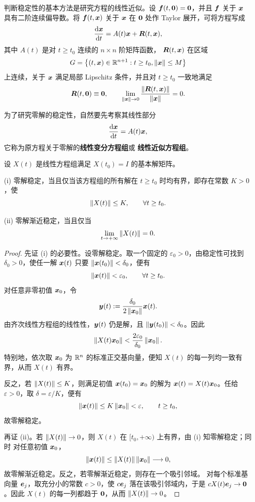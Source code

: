 判断稳定性的基本方法是研究方程的线性近似。设
$\boldsymbol{f}(t,\boldsymbol{0})=\boldsymbol{0}$，并且 $\boldsymbol{f}$ 关于
$\boldsymbol{x}$ 具有二阶连续偏导数。将 $\boldsymbol{f}(t,\boldsymbol{x})$ 关于
$\boldsymbol{x}$ 在 $\boldsymbol{0}$ 处作 Taylor 展开，可将方程写成
\[
	\dfrac{\mathrm{d}\boldsymbol{x}}{\mathrm{d} t}
	=A(t)\boldsymbol{x}+\boldsymbol{R}(t,\boldsymbol{x}),
\]
其中 $A(t)$ 是对 $t\geq t_0$ 连续的 $n\times n$ 阶矩阵函数，
$\boldsymbol{R}(t,\boldsymbol{x})$ 在区域
\[
	G=\left\{
	(t,\boldsymbol{x})\in\mathbb{R}^{n+1}:
	t\geq t_0,
	\left\| \boldsymbol{x} \right\|\leq M
	\right\}
\]
上连续，关于 $\boldsymbol{x}$ 满足局部 Lipschitz 条件，并且对
$t\geq t_0$ 一致地满足
\[
	\boldsymbol{R}(t,\boldsymbol{0})\equiv\boldsymbol{0},
	\qquad
	\lim_{\left\| \boldsymbol{x} \right\|\to0}
	\dfrac{\left\| \boldsymbol{R}(t,\boldsymbol{x}) \right\|}
	{\left\| \boldsymbol{x} \right\|}=0.
\]

为了研究零解的稳定性，自然要先考察其线性部分
\[
	\dfrac{\mathrm{d}\boldsymbol{x}}{\mathrm{d} t}=A(t)\boldsymbol{x},
\]
它称为原方程关于零解的\textbf{线性变分方程组}或
\textbf{线性近似方程组}。

\begin{lemma}\label{lem:线性系统零解稳定性判据}
	设 $X(t)$ 是线性方程组满足 $X(t_0)=I$ 的基本解矩阵。

	\textnormal{(i)} 零解稳定，当且仅当该方程组的所有解在
	$t\geq t_0$ 时均有界，即存在常数 $K>0$，使
	\[
		\left\| X(t) \right\|\leq K,
		\qquad \forall t\geq t_0.
	\]

	\textnormal{(ii)} 零解渐近稳定，当且仅当
	\[
		\lim_{t\to+\infty}\left\| X(t) \right\|=0.
	\]
\end{lemma}

\begin{proof}
	先证 \textnormal{(i)} 的必要性。设零解稳定。取一个固定的
	$\varepsilon_0>0$，由稳定性可找到 $\delta_0>0$，使任一解
$\boldsymbol{x}(t)$ 只要 $\left\| \boldsymbol{x}(t_0) \right\|<\delta_0$，便有
	\[
		\left\| \boldsymbol{x}(t) \right\|<\varepsilon_0,
		\qquad \forall t\geq t_0.
	\]
	对任意非零初值 $\boldsymbol{x}_0$，令
	\[
		\boldsymbol{y}(t)
		\mathrel{:=}
		\dfrac{\delta_0}{2\left\| \boldsymbol{x}_0 \right\|}\boldsymbol{x}(t).
	\]
	由齐次线性方程组的线性性，$\boldsymbol{y}(t)$ 仍是解，且
	$\left\| \boldsymbol{y}(t_0) \right\|<\delta_0$。因此
	\[
		\left\| X(t)\boldsymbol{x}_0 \right\|
		<\dfrac{2\varepsilon_0}{\delta_0}
		\left\| \boldsymbol{x}_0 \right\|.
	\]
	特别地，依次取 $\boldsymbol{x}_0$ 为 $\mathbb{R}^n$ 的标准正交基向量，便知
	$X(t)$ 的每一列均一致有界，从而 $X(t)$ 有界。

	反之，若 $\left\| X(t) \right\|\leq K$，则满足初值
	$\boldsymbol{x}(t_0)=\boldsymbol{x}_0$ 的解为
	$\boldsymbol{x}(t)=X(t)\boldsymbol{x}_0$。任给 $\varepsilon>0$，取
	$\delta=\varepsilon/K$，便有
	\[
		\left\| \boldsymbol{x}(t) \right\|
		\leq K\left\| \boldsymbol{x}_0 \right\|<\varepsilon,
		\qquad t\geq t_0,
	\]
	故零解稳定。

	再证 \textnormal{(ii)}。若 $\left\| X(t) \right\|\to0$，则 $X(t)$ 在
	$[t_0,+\infty)$ 上有界，由 \textnormal{(i)} 知零解稳定；同时
	对任意初值 $\boldsymbol{x}_0$，
	\[
		\left\| \boldsymbol{x}(t) \right\|
		\leq\left\| X(t) \right\|\left\| \boldsymbol{x}_0 \right\|\longrightarrow0,
	\]
	故零解渐近稳定。反之，若零解渐近稳定，则存在一个吸引邻域。
	对每个标准基向量 $\boldsymbol{e}_j$，取充分小的常数 $c>0$，使
	$c\boldsymbol{e}_j$ 落在该吸引邻域内，于是
	$cX(t)\boldsymbol{e}_j\to\boldsymbol{0}$。因此 $X(t)$ 的每一列都趋于
	$\boldsymbol{0}$，从而 $\left\| X(t) \right\|\to0$。
\end{proof}

